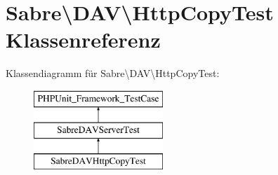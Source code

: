\hypertarget{class_sabre_1_1_d_a_v_1_1_http_copy_test}{}\section{Sabre\textbackslash{}D\+AV\textbackslash{}Http\+Copy\+Test Klassenreferenz}
\label{class_sabre_1_1_d_a_v_1_1_http_copy_test}
Klassendiagramm für Sabre\textbackslash{}D\+AV\textbackslash{}Http\+Copy\+Test\+:\begin{figure}[H]
\begin{center}
\leavevmode
\includegraphics[height=3.000000cm]{class_sabre_1_1_d_a_v_1_1_http_copy_test}
\end{center}
\end{figure}

